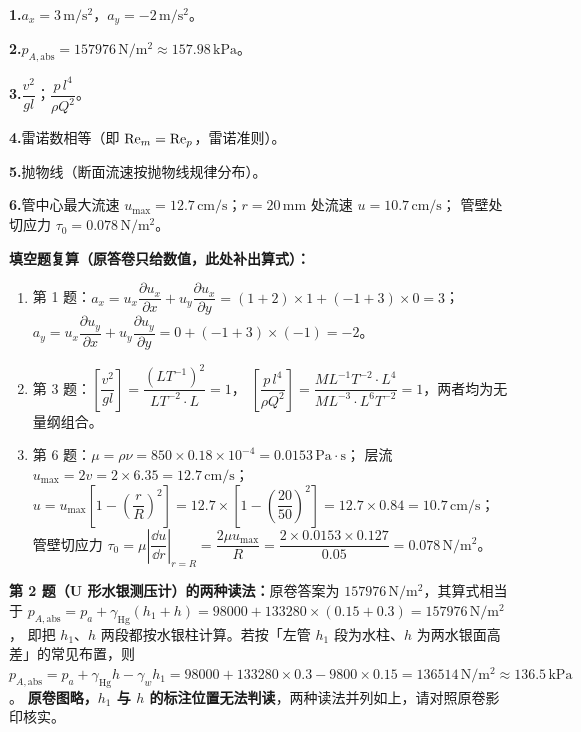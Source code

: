 
\noindent\textbf{1.}\quad $a_x=3\,\mathrm{m/s^2}$，$a_y=-2\,\mathrm{m/s^2}$。

\smallskip
\noindent\textbf{2.}\quad $p_{A,\mathrm{abs}}=157976\,\mathrm{N/m^2}\approx157.98\,\mathrm{kPa}$。

\smallskip
\noindent\textbf{3.}\quad $\dfrac{v^{2}}{gl}$；\qquad $\dfrac{p\,l^{4}}{\rho Q^{2}}$。

\smallskip
\noindent\textbf{4.}\quad 雷诺数相等（即 $\mathrm{Re}_m=\mathrm{Re}_p$，雷诺准则）。

\smallskip
\noindent\textbf{5.}\quad 抛物线（断面流速按抛物线规律分布）。

\smallskip
\noindent\textbf{6.}\quad 管中心最大流速 $u_{\max}=12.7\,\mathrm{cm/s}$；$r=20\,\mathrm{mm}$ 处流速 $u=10.7\,\mathrm{cm/s}$；
管壁处切应力 $\tau_0=0.078\,\mathrm{N/m^2}$。

\begin{tishi}
\textbf{填空题复算（原答卷只给数值，此处补出算式）：}
\begin{enumerate}
  \item 第 1 题：$a_x=u_x\dfrac{\partial u_x}{\partial x}+u_y\dfrac{\partial u_x}{\partial y}=(1+2)\times1+(-1+3)\times0=3$；
    $a_y=u_x\dfrac{\partial u_y}{\partial x}+u_y\dfrac{\partial u_y}{\partial y}=0+(-1+3)\times(-1)=-2$。
  \item 第 3 题：$\left[\dfrac{v^{2}}{gl}\right]=\dfrac{(LT^{-1})^{2}}{LT^{-2}\cdot L}=1$，
    $\left[\dfrac{p\,l^{4}}{\rho Q^{2}}\right]=\dfrac{ML^{-1}T^{-2}\cdot L^{4}}{ML^{-3}\cdot L^{6}T^{-2}}=1$，两者均为无量纲组合。
  \item 第 6 题：$\mu=\rho\nu=850\times0.18\times10^{-4}=0.0153\,\mathrm{Pa\cdot s}$；
    层流 $u_{\max}=2v=2\times6.35=12.7\,\mathrm{cm/s}$；
    $u=u_{\max}\left[1-\left(\dfrac rR\right)^{2}\right]=12.7\times\left[1-\left(\dfrac{20}{50}\right)^{2}\right]=12.7\times0.84=10.7\,\mathrm{cm/s}$；
    管壁切应力 $\tau_0=\mu\left|\dfrac{\dd u}{\dd r}\right|_{r=R}=\dfrac{2\mu u_{\max}}{R}
    =\dfrac{2\times0.0153\times0.127}{0.05}=0.078\,\mathrm{N/m^2}$。
\end{enumerate}
\end{tishi}

\begin{tishi}
\textbf{第 2 题（U 形水银测压计）的两种读法：}原卷答案为 $157976\,\mathrm{N/m^2}$，其算式相当于
$p_{A,\mathrm{abs}}=p_a+\gamma_{\mathrm{Hg}}(h_1+h)=98000+133280\times(0.15+0.3)=157976\,\mathrm{N/m^2}$，
即把 $h_1$、$h$ 两段都按水银柱计算。若按「左管 $h_1$ 段为水柱、$h$ 为两水银面高差」的常见布置，则
$p_{A,\mathrm{abs}}=p_a+\gamma_{\mathrm{Hg}}h-\gamma_{w}h_1=98000+133280\times0.3-9800\times0.15=136514\,\mathrm{N/m^2}\approx136.5\,\mathrm{kPa}$。
\textbf{原卷图略，$h_1$ 与 $h$ 的标注位置无法判读}，两种读法并列如上，请对照原卷影印核实。
\end{tishi}

